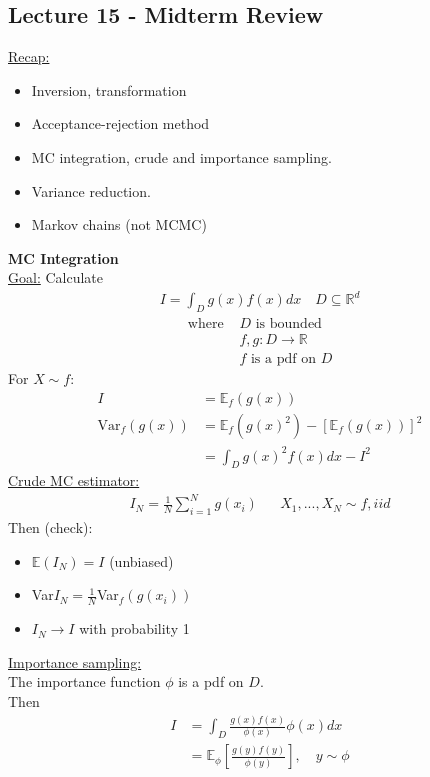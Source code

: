 \documentclass[12pt, letterpaper]{article}
\begin{document}
\subsection{Lecture 15 - Midterm Review}
\underline{Recap:}
\begin{itemize}
    \item Inversion, transformation
    \item Acceptance-rejection method
    \item MC integration, crude and importance sampling.
    \item Variance reduction.
    \item Markov chains (not MCMC)
\end{itemize}
\textbf{MC Integration} \\
\underline{Goal:} Calculate 
\begin{align*}
    I = \int_D g(x)f(x)dx \quad D \subseteq \mathbb{R}^d
\end{align*}
\begin{align*}
    \text{where } &D \text{ is bounded} \\
    &f,g: D \rightarrow \mathbb{R} \\
    &f \text{ is a pdf on } D
\end{align*}
For $X \sim f$: 
\begin{align*}
    I &= \mathbb{E}_f(g(x)) \\
    \text{Var}_f(g(x)) &= \mathbb{E}_f(g(x)^2) - [\mathbb{E}_f(g(x))]^2 \\
    &= \int_D g(x)^2 f(x) dx - I^2
\end{align*}
\underline{Crude MC estimator:} \\
\begin{align*}
    I_N = \frac 1N \sum_{i=1}^{N}g(x_i) && X_1, ...,X_N \sim f, iid
\end{align*}
Then (check):
\begin{itemize}
    \item $\mathbb{E}(I_N) = I$ (unbiased)
    \item Var$I_N = \frac 1N $Var$_f (g(x_i))$
    \item $I_N \rightarrow I$ with probability 1
\end{itemize}
\underline{Importance sampling:} \\
The importance function $\phi$ is a pdf on $D$. \\
Then 
\begin{align*}
    I &= \int_D \frac{g(x)f(x)}{\phi(x)}\phi(x)dx \\
    &= \mathbb{E}_\phi \left[\frac{g(y)f(y)}{\phi(y)}\right], \quad y \sim \phi
\end{align*}
\end{document}
